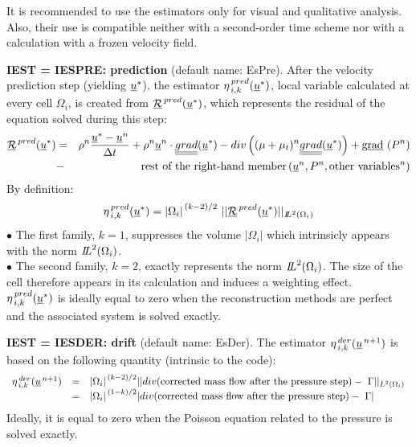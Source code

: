 It is recommended to use the estimators only for visual and qualitative
analysis. Also, their use is compatible neither with a second-order time scheme
nor with a calculation with a frozen velocity field.

{\bf IEST = IESPRE: prediction} (default name: EsPre). 
After the velocity prediction step (yielding $\underline{u}^*$), the
estimator $\eta^{\,pred}_{\,i,k}(\underline{u}^*)$, local variable calculated
at every cell $\Omega_i$, is created from $\underline{\mathcal
R}^{\,pred}(\underline{u}^*)$, which represents the residual of the equation
solved during this step:
\begin{eqnarray*}
\underline{\mathcal R}^{\,pred}(\underline{u}^*)&= & \rho^n \frac{\underline{u}^*-\underline{u}^n}{\Delta t} 
              + \rho^n \underline{u}^n \cdot \underline{\underline{grad}}(\underline{u}^*)        
              - div \left((\mu+\mu_t)^n \underline{\underline{grad}}(\underline{u}^*) \right)
              + \text{g}\underline{\text{rad}}\ (P^n)     \\
              &- &\text{rest of the right-hand member} 
                        \,(\underline{u}^n, P^n, \text{other variables}^n)
\end{eqnarray*}
By definition: 
$$ \eta^{\,pred}_{\,i,k}(\underline{u}^*)= {|\Omega_i|}^{\,(k-2)/2}\ ||\underline{\mathcal R}^{\,pred}(\underline{u}^*)||
_{{I\hspace{-.25em}L}^{2}(\Omega_i)}$$
\hspace*{0.5cm}$\bullet$ The first family, $k=1$, suppresses the
volume $|\Omega_i|$ which intrinsicly appears  with the norm
${{I\hspace{-.25em}L}^{2}(\Omega_i)}$.\\ 
\hspace*{0.5cm}$\bullet$ The second family, $k=2$, exactly represents the norm
${{I\hspace{-.25em}L}^{2}(\Omega_i)}$. The size of the cell therefore
appears in its calculation and induces a weighting effect.\\
$ \eta^{\,pred}_{\,i,k}(\underline{u}^*)$  is ideally equal to zero when the
reconstruction methods are perfect and the associated system is
solved exactly. 

{\bf IEST = IESDER: drift}  (default name: EsDer).            
The estimator $\eta^{\,der}_{\,i,k}(\underline{u}^{\,n+1})$ is based on the
following quantity (intrinsic to the code):   
\begin{equation}
\begin{array}{lll}
 \eta^{\,der}_{\,i,k}(\vect{u}^{\,n+1}) 
&=& {|\Omega_i|}^{\,(k-2)/2} 
||div (\text{corrected mass flow after the pressure step})
                                              -\ \Gamma||_{{L}^{2}(\Omega_i)} \\
&=& {|\Omega_i|}^{\,(1-k)/2} 
|div (\text{corrected mass flow after the pressure step})-\ \Gamma|  
\end{array}
\end{equation} 
Ideally, it is equal to zero when the Poisson equation related to the pressure is
solved exactly.
                             
